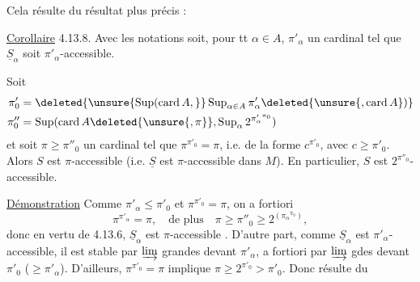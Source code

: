 Cela résulte du résultat plus précis :

\uline{Corollaire} 4.13.8. Avec les notations 
soit, pour tt $\alpha\in A$, $\pi'_\alpha$ un cardinal  tel que
$\underline S_\alpha$ soit $\pi'_\alpha$-accessible.

 Soit
\[
\begin{aligned}
\pi'_0&=\deleted{\unsure{\operatorname{Sup}(\operatorname{card}A,}}\operatorname{Sup}_{\alpha\in A}\pi'_\alpha \deleted{\unsure{,\operatorname{card} A})}\\
\pi''_0&=\operatorname{Sup}(\operatorname{card}A\deleted{\unsure{,\pi}},\operatorname{Sup}_\alpha 2^{{\pi'_\alpha}^{\pi_0}})
\end{aligned}
\]
et soit $\pi\geq\pi''_0$ un cardinal tel que
$\pi^{\pi'_0}=\pi$, i.e. de la forme $c^{\pi'_0}$, avec $c\geq\pi'_0$.
Alors $S$ est $\pi$-accessible (i.e. $\underline S$ est $\pi$-accessible
dans $M$). En particulier, $S$ est $2^{\pi''_0}$-accessible.

\uline{Démonstration}   Comme
$\pi'_\alpha\leq\pi'_0$ et $\pi^{\pi'_0}=\pi$, on
 a fortiori
\[
\pi^{\pi'_\alpha}=\pi,\quad\text{de plus}\quad \pi\geq\pi''_0\geq 2^{({\pi_\alpha}^{\pi_0})},
\]
donc en vertu de 4.13.6, $\underline S_\alpha$ est
$\pi$-accessible . D'autre part, comme $\underline S_\alpha$ est
$\pi'_\alpha$-accessible, il est stable  par $\varinjlim$ grandes
devant $\pi'_\alpha$, a fortiori par $\varinjlim$ gdes devant
$\pi'_0$ ($\geq\pi'_\alpha$). D'ailleurs, $\pi^{\pi'_0}=\pi$ implique
$\pi\geq 2^{\pi'_0}>\pi'_0$. Donc  résulte du

